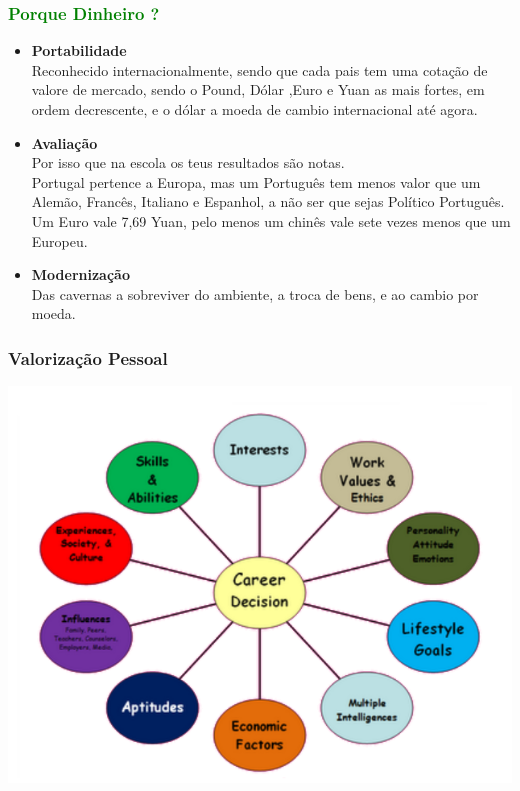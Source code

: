 \begin{frame}
\frametitle{\textcolor{green}{Porque Dinheiro ?}}
\begin{itemize}
	\item \textbf{Portabilidade} \\
	Reconhecido internacionalmente, sendo que cada pais tem uma cotação de valore de mercado, sendo o Pound, Dólar ,Euro e Yuan as mais fortes, em ordem decrescente, e o dólar a moeda de cambio internacional até agora.
	\item \textbf{Avaliação} \\
	Por isso que na escola os teus resultados são notas.\\
	Portugal pertence a Europa, mas um Português tem menos valor que um Alemão, Francês, Italiano e Espanhol, a não ser que sejas Político Português.\\Um Euro vale 7,69 Yuan, pelo menos um chinês vale sete vezes menos que um Europeu.\\
	\item \textbf{Modernização} \\
	Das cavernas a sobreviver do ambiente, a troca de bens, e ao cambio por moeda.
\end{itemize}
\end{frame}
\begin{frame}
\frametitle{Valorização Pessoal}
\begin{center}
\includegraphics[scale=0.4]{"./image/Career Path/Career Decision Factors"}
\end{center}
\end{frame}
